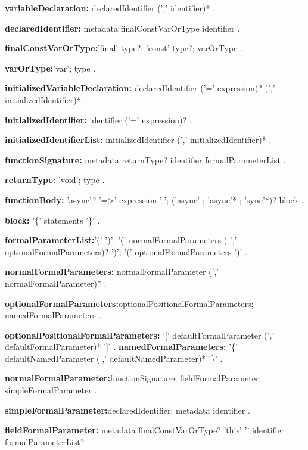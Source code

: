  
\begin{grammar}
{\bf variableDeclaration:}
      declaredIdentifier (',' identifier)*
      .
      
{\bf declaredIdentifier:}
      metadata finalConstVarOrType identifier
    .

{\bf finalConstVarOrType:}'final' type?;
           'const' type?;
  varOrType
    .
    
 {\bf varOrType:}'var';
  type
    .

 {\bf initializedVariableDeclaration:}
      declaredIdentifier ('=' expression)? (',' initializedIdentifier)* %
    .

{\bf initializedIdentifier:}
      identifier ('=' expression)? %
    .
    
{\bf initializedIdentifierList:}
      initializedIdentifier (',' initializedIdentifier)*
    .




  \end{grammar}
\begin{grammar}
{\bf functionSignature:}
    metadata returnType? identifier formalParameterList
    .
    
{\bf returnType:}
      'void';
      type
    .

{\bf functionBody:} 'async'?  '=>' expression ';';
     ('async' ; 'async'* ; 'sync'*)? block
    .

{\bf block:}
      '\{' statements '\}'
    .

\end{grammar}
\begin{grammar}
{\bf formalParameterList:}'(' ')';
 '(' normalFormalParameters ( ','  optionalFormalParameters)? ')';
  '(' optionalFormalParameters ')'
   .
\end{grammar}
\begin{grammar}

{\bf normalFormalParameters:}
      normalFormalParameter (',' normalFormalParameter)*
    .

{\bf optionalFormalParameters:}optionalPositionalFormalParameters;
      namedFormalParameters
    .

{\bf optionalPositionalFormalParameters:}
      '[' defaultFormalParameter (',' defaultFormalParameter)* ']'
    .
{\bf namedFormalParameters:}
      '\{' defaultNamedParameter (',' defaultNamedParameter)* '\}'
    .
\end{grammar}
\begin{grammar}
{\bf normalFormalParameter:}functionSignature;
      fieldFormalParameter;
      simpleFormalParameter
 .

{\bf simpleFormalParameter:}declaredIdentifier;
      metadata identifier
    .

{\bf fieldFormalParameter:}
   metadata finalConstVarOrType? 'this' '.' identifier formalParameterList?
   .
\end{grammar}


